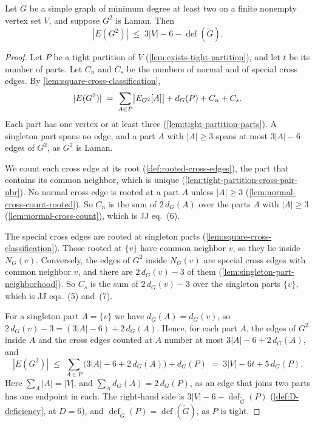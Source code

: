 \begin{theorem}
  \label{thm:laman-square-count}
  \leanok
  Let $G$ be a simple graph of minimum degree at least two on a finite
  nonempty vertex set $V$, and suppose $G^2$ is Laman. Then
  \[
    |E(G^2)| \;\le\; 3|V| - 6 - \operatorname{def}(\tilde G).
  \]
\end{theorem}
\begin{proof}
  \leanok
  Let $P$ be a tight partition of $V$
  (\cref{lem:exists-tight-partition}), and let $t$ be its number of
  parts. Let $C_n$ and $C_s$ be the numbers of normal and of special
  cross edges. By \cref{lem:square-cross-classification},
  \[
    |E(G^2)| \;=\; \sum_{A \in P} \bigl|\edgesIn[G^2]{A}\bigr|
      + d_G(P) + C_n + C_s .
  \]
  Each part has one vertex or at least three
  (\cref{lem:tight-partition-parts}). A singleton part spans no edge,
  and a part $A$ with $|A| \ge 3$ spans at most $3|A| - 6$ edges of
  $G^2$, as $G^2$ is Laman.

  We count each cross edge at its root (\cref{def:rooted-cross-edges}),
  the part that contains its common neighbor, which is unique
  (\cref{lem:tight-partition-cross-pair-nbr}). No normal cross edge is
  rooted at a part $A$ unless $|A| \ge 3$
  (\cref{lem:normal-cross-count-rooted}). So $C_n$ is the sum of
  $2\,d_G(A)$ over the parts $A$ with $|A| \ge 3$
  (\cref{lem:normal-cross-count}), which is JJ eq.~(6).

  The special cross edges are rooted at singleton parts
  (\cref{lem:square-cross-classification}). Those rooted at $\{v\}$
  have common neighbor $v$, so they lie inside $N_G(v)$. Conversely, the
  edges of $G^2$ inside $N_G(v)$ are special cross edges with common
  neighbor $v$, and there are $2\,d_G(v) - 3$ of them
  (\cref{lem:singleton-part-neighborhood}). So $C_s$ is the sum of
  $2\,d_G(v) - 3$ over the singleton parts $\{v\}$, which is JJ
  eqs.~(5) and~(7).

  For a singleton part $A = \{v\}$ we have $d_G(A) = d_G(v)$, so
  $2\,d_G(v) - 3 = (3|A| - 6) + 2\,d_G(A)$. Hence, for each part $A$,
  the edges of $G^2$ inside $A$ and the cross edges counted at $A$
  number at most $3|A| - 6 + 2\,d_G(A)$, and
  \[
    |E(G^2)| \;\le\; \sum_{A \in P} \bigl(3|A| - 6 + 2\,d_G(A)\bigr)
      + d_G(P) \;=\; 3|V| - 6t + 5\,d_G(P).
  \]
  Here $\sum_A |A| = |V|$, and $\sum_A d_G(A) = 2\,d_G(P)$, as an edge
  that joins two parts has one endpoint in each. The right-hand side is
  $3|V| - 6 - \operatorname{def}_{\tilde G}(P)$
  (\cref{def:D-deficiency}, at $D = 6$), and
  $\operatorname{def}_{\tilde G}(P) = \operatorname{def}(\tilde G)$, as
  $P$ is tight.
\end{proof}

